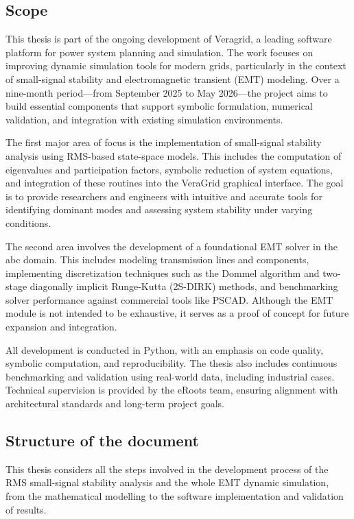 \subsection{Scope}

This thesis is part of the ongoing development of Veragrid, a leading software platform for power system planning and simulation. 
The work focuses on improving dynamic simulation tools for modern grids, particularly in the context of small-signal stability and electromagnetic transient (EMT) modeling.
Over a nine-month period—from September 2025 to May 2026—the project aims to build essential components that support symbolic formulation, numerical validation,
and integration with existing simulation environments. 

The first major area of focus is the implementation of small-signal stability analysis using RMS-based state-space models.
This includes the computation of eigenvalues and participation factors, symbolic reduction of system equations,
and integration of these routines into the VeraGrid graphical interface.
The goal is to provide researchers and engineers with intuitive and accurate tools for identifying dominant modes and assessing system stability under varying conditions.

The second area involves the development of a foundational EMT solver in the abc domain. This includes modeling transmission lines and components,
implementing discretization techniques such as the Dommel algorithm and two-stage diagonally implicit Runge-Kutta (2S-DIRK) methods,
and benchmarking solver performance against commercial tools like PSCAD. Although the EMT module is not intended to be exhaustive,
it serves as a proof of concept for future expansion and integration.

All development is conducted in Python, with an emphasis on code quality, symbolic computation, and reproducibility.
The thesis also includes continuous benchmarking and validation using real-world data, including industrial cases.
Technical supervision is provided by the eRoots team, ensuring alignment with architectural standards and long-term project goals.

\subsection{Structure of the document}

This thesis considers all the steps involved in the development process of the RMS small-signal stability analysis and the whole EMT
dynamic simulation, from the mathematical modelling to the software implementation and validation of results.

